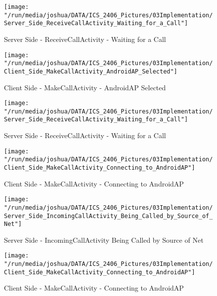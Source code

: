 \documentclass[12pt,svgnames,smaller]{article} %
\begin{document}
		\begin{figure}
			\centering
			\begin{minipage}{.5\textwidth}
				\centering
				\texttt{[image: "/run/media/joshua/DATA/ICS\_2406\_Pictures/03Implementation/Server\_Side\_ReceiveCallActivity\_Waiting\_for\_a\_Call"]}
				\caption{Server Side - ReceiveCallActivity - Waiting for a Call}
				\label{fig:Implementation-Figure7}			
			\end{minipage}%
			\begin{minipage}{0.5\textwidth}
				\centering
				\texttt{[image: "/run/media/joshua/DATA/ICS\_2406\_Pictures/03Implementation/Client\_Side\_MakeCallActivity\_AndroidAP\_Selected"]}
				\caption{Client Side - MakeCallActivity - AndroidAP Selected}
				\label{fig:Implementation-Figure8}
			\end{minipage}
		\end{figure} 		

		\begin{figure}
			\centering
			\begin{minipage}{.5\textwidth}
				\centering
				\texttt{[image: "/run/media/joshua/DATA/ICS\_2406\_Pictures/03Implementation/Server\_Side\_ReceiveCallActivity\_Waiting\_for\_a\_Call"]}
				\caption{Server Side - ReceiveCallActivity - Waiting for a Call}
				\label{fig:Implementation-Figure9}			
			\end{minipage}%
			\begin{minipage}{0.5\textwidth}
				\centering
				\texttt{[image: "/run/media/joshua/DATA/ICS\_2406\_Pictures/03Implementation/Client\_Side\_MakeCallActivity\_Connecting\_to\_AndroidAP"]}
				\caption{Client Side - MakeCallActivity - Connecting to AndroidAP}
				\label{fig:Implementation-Figure10}
			\end{minipage}
		\end{figure} 		

		\begin{figure}
			\centering
			\begin{minipage}{.5\textwidth}
				\centering
				\texttt{[image: "/run/media/joshua/DATA/ICS\_2406\_Pictures/03Implementation/Server\_Side\_IncomingCallActivity\_Being\_Called\_by\_Source\_of\_Net"]}
				\caption{Server Side - IncomingCallActivity Being Called by Source of Net}
				\label{fig:Implementation-Figure11}			
			\end{minipage}%
			\begin{minipage}{0.5\textwidth}
				\centering
				\texttt{[image: "/run/media/joshua/DATA/ICS\_2406\_Pictures/03Implementation/Client\_Side\_MakeCallActivity\_Connecting\_to\_AndroidAP"]}
				\caption{Client Side - MakeCallActivity - Connecting to AndroidAP}
				\label{fig:Implementation-Figure12}
			\end{minipage}
		\end{figure} 		
		
\end{document}
